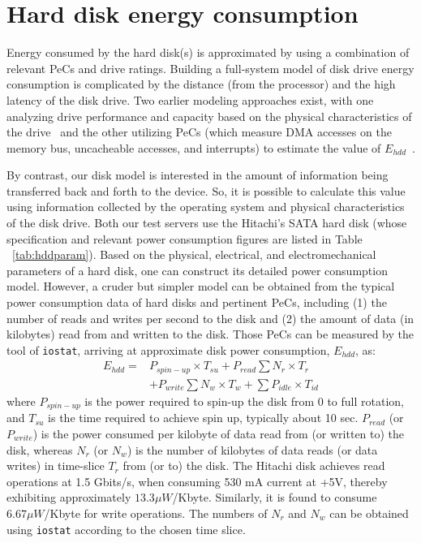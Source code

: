 \section{Hard disk energy consumption}
\label{sec:networkengery}
Energy consumed by the hard disk(s) is approximated by using a
combination of relevant PeCs and drive ratings. Building a full-system
model of disk drive energy consumption is complicated by the distance
(from the processor) and the high latency of the disk drive.  Two
earlier modeling approaches exist, with one analyzing drive performance
and capacity based on the physical characteristics of the
drive~\cite{Gurumurthi2005} and the other utilizing PeCs (which measure
DMA accesses on the memory bus, uncacheable accesses, and interrupts) to
estimate the value of $E_{hdd}$~\cite{Bircher2011}.

By contrast, our disk model is interested in the amount of information
being transferred back and forth to the device.  So, it is possible to
calculate this value using information collected by the operating system
and physical characteristics of the disk drive. Both our test servers
use the Hitachi's SATA hard disk (whose specification and relevant power
consumption figures are listed in Table ~\ref{tab:hddparam}).  Based on
the physical, electrical, and electromechanical parameters of a hard
disk, one can construct its detailed power consumption model.  However,
a cruder but simpler model can be obtained from the typical power
consumption data of hard disks and pertinent PeCs, including (1) the
number of reads and writes per second to the disk and (2) the amount of
data (in kilobytes) read from and written to the disk.  Those PeCs can
be measured by the tool of \texttt{iostat}, arriving at approximate disk
power consumption, $E_{hdd}$, as:
\begin{align*}
\label{eq:hddpwr1}
E_{hdd} = &P_{spin-up}\times T_{su}+  P_{read}\sum N_r\times T_r \nonumber\\
        &+ P_{write}\sum N_w\times T_w+ \sum P_{idle}\times T_{id}
\end{align*}
where $P_{spin-up}$ is the power required to spin-up the disk from 0 to
full rotation, and $T_{su}$ is the time required to achieve spin up,
typically about 10 sec.  $P_{read}$ (or $P_{write}$) is the power
consumed per kilobyte of data read from (or written to) the disk,
whereas $N_r$ (or $N_w$) is the number of kilobytes of data reads (or
data writes) in time-slice $T_r$ from (or to) the disk.  The Hitachi
disk achieves read operations at 1.5 Gbits/s, when consuming 530 mA
current at +5V, thereby exhibiting approximately $13.3 \mu W$/Kbyte.
Similarly, it is found to consume $6.67 \mu W$/Kbyte for write
operations.  The numbers of $N_r$ and $N_w$ can be obtained using
\texttt{iostat} according to the chosen time slice.

